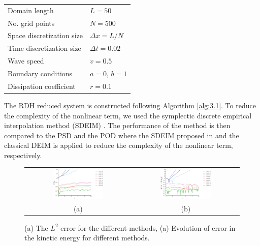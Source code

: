 \vspace{0.5cm}
\begin{center}
\begin{tabular}{|l|l|}
\hline
Domain length & $L = 50$ \\
No. grid points & $N = 500$ \\
Space discretization size & $\Delta x = L/N$ \\
Time discretization size & $\Delta t = 0.02$ \\
Wave speed & $v = 0.5$ \\
Boundary conditions & $a = 0$, $b=1$\\
Dissipation coefficient & $r = 0.1$ \\
\hline
\end{tabular}
\end{center}
\vspace{0.5cm}

The RDH reduced system is constructed following Algorithm \ref{alg:3.1}. To reduce the complexity of the nonlinear term, we used the symplectic discrete empirical interpolation method (SDEIM) \cite{Maboudi:2016}. The performance of the method is then compared to the PSD and the POD where the SDEIM proposed in \cite{Peng:2014di} and the classical DEIM \cite{Chaturantabut:2010cz} is applied to reduce the complexity of the nonlinear term, respectively. 


\begin{figure}[t]
\begin{tabular}{cc}
\includegraphics[width=0.5\textwidth]{./figs/wave_nonlin/error_nonlin} & 
\includegraphics[width=0.5\textwidth]{./figs/wave_nonlin/energy_nonlin} \\
(a) & (b)
\end{tabular}
\caption{(a) The $L^2$-error for the different methods, (a) Evolution of error in the kinetic energy for different methods.} \label{fig:added4.1}
\end{figure}

